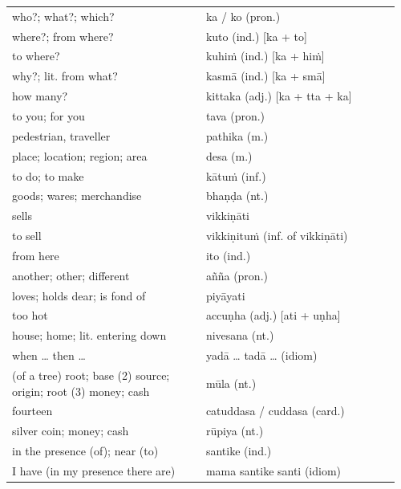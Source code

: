 \documentclass[11pt,oneside]{memoir}
\begin{document}
\begin{longtable}{L{0.48\linewidth} L{0.48\linewidth}}
who?; what?; which? & ka / ko (pron.)\\
where?; from where? & kuto (ind.) [ka + to]\\
to where? & kuhiṁ (ind.) [ka + hiṁ]\\
why?; lit. from what? & kasmā (ind.) [ka + smā]\\
how many? & kittaka (adj.) [ka + tta + ka]\\
to you; for you & tava (pron.)\\
pedestrian, traveller & pathika (m.)\\
place; location; region; area & desa (m.)\\
to do; to make & kātuṁ (inf.)\\
goods; wares; merchandise & bhaṇḍa (nt.)\\
sells & vikkiṇāti\\
to sell & vikkiṇituṁ (inf. of vikkiṇāti)\\
from here & ito (ind.)\\
another; other; different & añña (pron.)\\
loves; holds dear; is fond of & piyāyati\\
too hot & accuṇha (adj.) [ati + uṇha]\\
house; home; lit. entering down & nivesana (nt.)\\
when \ldots{} then \ldots{} & yadā \ldots{} tadā \ldots{} (idiom)\\
(of a tree) root; base (2) source; origin; root (3) money; cash & mūla (nt.)\\
fourteen & catuddasa / cuddasa (card.)\\
silver coin; money; cash & rūpiya (nt.)\\
in the presence (of); near (to) & santike (ind.)\\
I have (in my presence there are) & mama santike santi (idiom)\\
\end{longtable}

\renewcommand{\arraystretch}{1.4}
\end{document}
